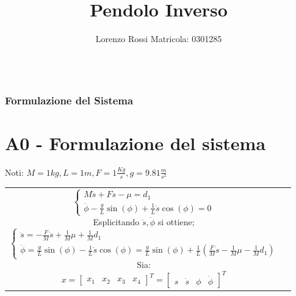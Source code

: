 \documentclass{beamer}
\title[Assignments 7]{Pendolo Inverso}
\author{Lorenzo Rossi Matricola: 0301285}
\begin{document}
\begin{frame}
	\titlepage{}
\end{frame}
\begin{frame}
	\begin{columns}[t]
		\begin{column}{.5\textwidth}
			\tableofcontents[sections={1-5}] %
		\end{column}
		\hspace{-1cm}
		\begin{column}{.5\textwidth}
			\tableofcontents[sections={6-11}] %
		\end{column}
	\end{columns}
\end{frame}
\begin{frame}
	\frametitle{Formulazione del Sistema}
	\section{A0 - Formulazione del sistema}%
	Noti: \(M=1 kg,L=1m,F=1\frac{Kg}{s},g=9.81\frac{m}{s^2}\)\newline
	\begin{tabular}{c|c} %
		\begin{minipage}{0.55\textwidth}
			\begin{equation*}
				\begin{cases}
					M\ddot{s}+F\dot{s}-\mu=d_{1} \\
					\ddot{\phi}-\frac{g}{L}\sin{(\phi)}+\frac{1}{L}\ddot{s}\cos{(\phi)}=0
				\end{cases}
			\end{equation*}
			Esplicitando \(\ddot{s},\ddot{\phi}\) si ottiene;\small
			\begin{equation*}
				\begin{cases}
					\ddot{s}=-\frac{F}{M}\dot{s}+\frac{1}{M}\mu+\frac{1}{M}d_1 \\
					\ddot{\phi}=\frac{g}{L}\sin{(\phi)}-\frac{1}{L}\ddot{s}\cos{(\phi)}=\frac{g}{L}\sin{(\phi)}+\frac{1}{L}(\frac{F}{M}\dot{s}-\frac{1}{M}\mu-\frac{1}{M}d_1)
				\end{cases}
			\end{equation*}
			Sia:
			\begin{equation*}
				x=\begin{bmatrix}
					x_{1} & x_{2} & x_{3} & x_{4}
				\end{bmatrix}^{T}=\begin{bmatrix}s & \dot{s} & \phi & \dot{\phi}
				\end{bmatrix}^{T}

\end{equation*}
\end{minipage}
\end{tabular}
\end{frame}
\end{document}
